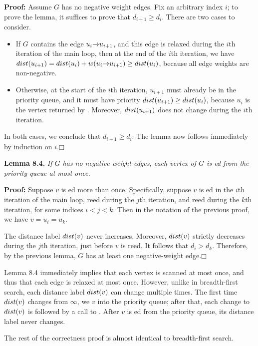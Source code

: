 \textbf{Proof:} Assume $G$ has no negative weight edges.
Fix an arbitrary index $i$; to prove the lemma, it suffices to prove that $d_{i+1} \ge d_i$.
There are two cases to consider.
\begin{itemize}
\item If $G$ contains the edge $u_i\mathord{\rightarrow}u_{i+1}$, and this edge is relaxed during the $i$th iteration of the main loop, then at the end of the $i$th iteration, we have $dist(u_{i+1}) = dist(u_i) + w(u_i\mathord{\rightarrow}u_{i+1}) \ge dist(u_i)$, because all edge weights are non-negative.
\item Otherwise, at the start of the $i$th iteration, $u_{i+1}$ must already be in the priority queue, and it must have priority $dist(u_{i+1}) \ge dist(u_i)$, because $u_i$ is the vertex returned by .
Moreover, $dist(u_{i+1})$ does not change during the $i$th iteration.
\end{itemize}
In both cases, we conclude that $d_{i+1} \ge d_i$.
The lemma now follows immediately by induction on $i$.\hfill$\mdlgwhtsquare$

\textbf{Lemma 8.4.} \textsl{If $G$ has no negative-weight edges, each vertex of $G$ is ed from the priority queue at most once.}

\textbf{Proof:} Suppose $v$ is ed more than once.
Specifically, suppose $v$ is ed in the $i$th iteration of the main loop, reed during the $j$th iteration, and reed during the $k$th iteration, for some indices $i < j < k$.
Then in the notation of the previous proof, we have $v = u_i = u_k$.

The distance label $dist(v)$ never increases.
Moreover, $dist(v)$ strictly decreases during the $j$th iteration, just before $v$ is reed.
It follows that $d_i > d_k$.
Therefore, by the previous lemma, $G$ has at least one negative-weight edge.\hfill$\mdlgwhtsquare$

Lemma 8.4 immediately implies that each vertex is scanned at most once, and thus that each edge is relaxed at most once.
However, unlike in breadth-first search, each distance label $dist(v)$ can change multiple times.
The first time $dist(v)$ changes from $\infty$, we  $v$ into the priority queue; after that, each change to $dist(v)$ is followed by a call to .
After $v$ is ed from the priority queue, its distance label never changes.

The rest of the correctness proof is almost identical to breadth-first search.

